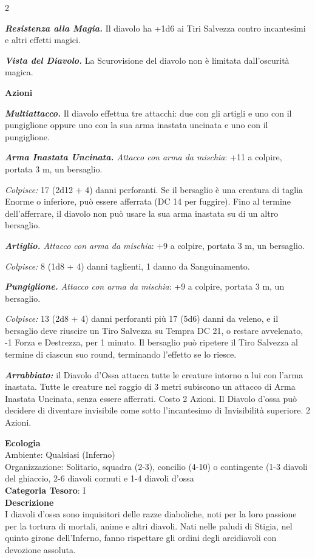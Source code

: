 \begin{multicols}{2}
{\emph{\textbf{Resistenza alla Magia.}} Il diavolo ha +1d6 ai Tiri Salvezza contro incantesimi e altri effetti magici.

\emph{\textbf{Vista del Diavolo.}} La Scurovisione del diavolo non è limitata dall'oscurità magica.

\textbf{Azioni}

\emph{\textbf{Multiattacco.}} Il diavolo effettua tre attacchi: due con gli artigli e uno con il pungiglione oppure uno con la sua arma inastata uncinata e uno con il pungiglione.

\emph{\textbf{Arma Inastata Uncinata.} Attacco con arma da mischia}: +11 a colpire, portata 3 m, un bersaglio.

\emph{Colpisce:} 17 (2d12 + 4) danni perforanti. Se il bersaglio è una creatura di taglia Enorme o inferiore, può essere afferrata (DC 14 per fuggire). Fino al termine dell'afferrare, il diavolo non può usare la sua arma inastata su di un altro bersaglio.

\emph{\textbf{Artiglio.} Attacco con arma da mischia}: +9 a colpire, portata 3 m, un bersaglio.

\emph{Colpisce:} 8 (1d8 + 4) danni taglienti, 1 danno da Sanguinamento.

\emph{\textbf{Pungiglione.} Attacco con arma da mischia}: +9 a colpire, portata 3 m, un bersaglio.

\emph{Colpisce:} 13 (2d8 + 4) danni perforanti più 17 (5d6) danni da veleno, e il bersaglio deve riuscire un Tiro Salvezza su Tempra DC 21, o restare avvelenato, -1 Forza e Destrezza, per 1 minuto. Il bersaglio può ripetere il Tiro Salvezza al termine di ciascun suo round, terminando l'effetto se lo riesce.

\emph{\textbf{Arrabbiato:}} il Diavolo d'Ossa attacca tutte le creature intorno a lui con l'arma inastata. Tutte le creature nel raggio di 3 metri subiscono un attacco di Arma Inastata Uncinata, senza essere afferrati. Costo 2 Azioni. Il Diavolo d'ossa può decidere di diventare invisibile come sotto l'incantesimo di Invisibilità superiore. 2 Azioni.

\textbf{Ecologia}\\
Ambiente: Qualsiasi (Inferno)\\
Organizzazione: Solitario, squadra (2-3), concilio (4-10) o contingente (1-3 diavoli del ghiaccio, 2-6 diavoli cornuti e 1-4 diavoli d'ossa\\
\textbf{Categoria Tesoro}: I\\
\textbf{Descrizione}\\
I diavoli d'ossa sono inquisitori delle razze diaboliche, noti per la loro passione per la tortura di mortali, anime e altri diavoli. Nati nelle paludi di Stigia, nel quinto girone dell'Inferno, fanno rispettare gli ordini degli arcidiavoli con devozione assoluta.

}
\end{multicols}
